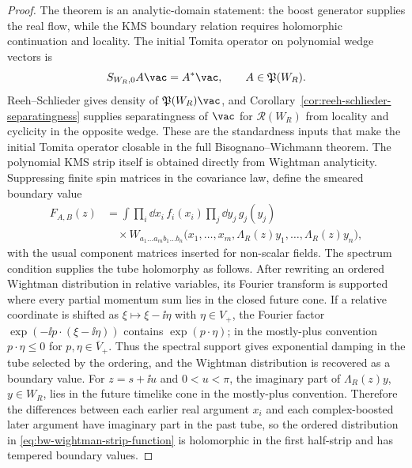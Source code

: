 \begin{proof}
The theorem is an analytic-domain statement: the boost generator supplies the
real flow, while the KMS boundary relation requires holomorphic continuation
and locality.  The initial Tomita operator on polynomial wedge vectors is
\[
  S_{W_R,0}A\vac=A^*\vac,
  \qquad A\in\mathfrak P(W_R).
\]
Reeh--Schlieder gives density of \(\mathfrak P(W_R)\vac\), and
Corollary~\ref{cor:reeh-schlieder-separatingness} supplies separatingness of
\(\vac\) for \(\mathcal R(W_R)\) from locality and cyclicity in the opposite
wedge.  These are the standardness inputs that make the initial Tomita
operator closable in the full Bisognano--Wichmann theorem.  The polynomial
KMS strip itself is
obtained directly from Wightman analyticity.  Suppressing finite spin matrices
in the covariance law, define the smeared boundary value
\begin{equation}
\begin{aligned}
  F_{A,B}(z)
  &=
  \int
  \prod_i \dd x_i\, f_i(x_i)
  \prod_j \dd y_j\, g_j(y_j)                                      \\
  &\quad\times
  W_{a_1\ldots a_m b_1\ldots b_n}
  \bigl(x_1,\ldots,x_m,\Lambda_R(z)y_1,\ldots,\Lambda_R(z)y_n\bigr),
\end{aligned}
  \label{eq:bw-wightman-strip-function}
\end{equation}
with the usual component matrices inserted for non-scalar fields.  The
spectrum condition supplies the tube holomorphy as follows.  After rewriting
an ordered Wightman distribution in relative variables, its Fourier transform
is supported where every partial momentum sum lies in the closed future cone.
If a relative coordinate is shifted as \(\xi\mapsto\xi-\ii\eta\) with
\(\eta\in V_+\), the Fourier factor
\(\exp(-\ii p\cdot(\xi-\ii\eta))\) contains \(\exp(p\cdot\eta)\); in the
mostly-plus convention \(p\cdot\eta\le0\) for
\(p,\eta\in\overline V_+\).  Thus the spectral support gives exponential
damping in the tube selected by the ordering, and the Wightman distribution is
recovered as a boundary value.  For
\(z=s+\ii u\) and \(0<u<\pi\), the imaginary part of
\(\Lambda_R(z)y\), \(y\in W_R\), lies in the future timelike cone in the
mostly-plus convention.  Therefore the differences between each earlier real
argument \(x_i\) and each complex-boosted later argument have imaginary part
in the past tube, so the ordered distribution in
\eqref{eq:bw-wightman-strip-function} is holomorphic in the first half-strip
and has tempered boundary values.


\end{proof}
